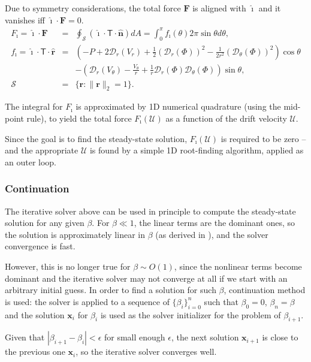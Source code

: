 \documentclass[final]{elsarticle}
\newcommand\eps \epsilon
\newcommand{\pars}[1]{\left(#1\right)}
\newcommand\bF{\boldsymbol{F}}
\newcommand\bx{\boldsymbol{x}}
\newcommand\br{\boldsymbol{r}}
\newcommand\brhat{\hat{\br}}
\newcommand\bnhat{\hat{\boldsymbol{n}}}
\newcommand\cD{\mathcal{D}}
\newcommand\cU{\mathscr{U}}
\newcommand\tT{\mathsf{T}}
\newcommand\ui{\boldsymbol{\hat{\imath}}}
\begin{document}
Due to symmetry considerations, the total force $\bF$ is 
aligned with $\ui$ and it vanishes iff $\ui \cdot \bF = 0$.
\begin{eqnarray*}
F_\imath = \ui \cdot \bF &=& 
\oint_\mathcal{S} \pars{\ui \cdot \tT \cdot \bnhat} dA = 
\int_0^\pi f_\imath(\theta) 2\pi \sin\theta d\theta ,
\\  
f_\imath = \ui \cdot \tT \cdot \brhat &=& \pars{-P + 2\cD_r(V_r) + 
\frac{1}{2}\pars{\cD_r(\varPhi)}^2 - \frac{1}{2r^2}\pars{\cD_\theta(\varPhi)}^2}\cos\theta 
\\  
&& -\pars{\cD_r(V_\theta) - \frac{V_\theta}{r}
+ \frac{1}{r}\cD_r(\varPhi) \cD_{\theta}(\varPhi)}\sin\theta, \\
 \mathcal{S} &=& \{\br : \|\br\|_2 = 1\}.
\end{eqnarray*}

The integral for $F_\imath$ is approximated by 1D numerical quadrature
(using the mid-point rule), to yield 
the total force $F_\imath(\cU)$ as a function of the drift velocity $\cU$.

Since the goal is to find the steady-state solution, $F_\imath(\cU)$ 
is required to be zero --
and the appropriate $\cU$ is found by a simple 1D root-finding algorithm,
applied as an outer loop.

\subsubsection{Continuation}

The iterative solver above can be used in principle to compute the steady-state solution for any given $\beta$.
For $\beta \ll 1$, the linear terms are the dominant ones, 
so the solution is approximately linear in $\beta$ 
(as derived in \cite{yariv2010migration}), and the solver convergence is fast.

However, this is no longer true for $\beta \sim O(1)$, since the nonlinear terms become dominant
and the iterative solver may not converge at all if we start with an arbitrary initial guess.
In order to find a solution for such $\beta$, continuation method is used:
the solver is applied to a sequence of $\{\beta_i\}_{i=0}^n$ such that $\beta_0 = 0$,
$\beta_n = \beta$ and the solution $\bx_i$ for $\beta_i$ is used as the solver initializer
for the problem of $\beta_{i+1}$.

Given that $|\beta_{i+1} - \beta_i| < \eps$ for small enough $\eps$, 
the next solution $\bx_{i+1}$ is close to the previous one $\bx_i$,
so the iterative solver converges well.
\end{document}
